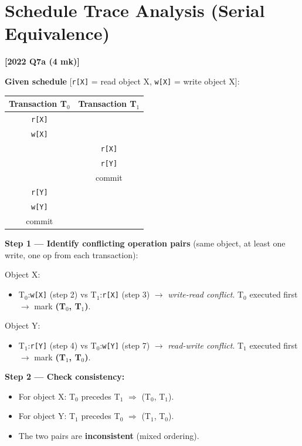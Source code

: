 \documentclass[11pt,a4paper]{article}
\newcommand{\qref}[1]{\textbf{\textcolor{examblue}{[#1]}}}
\newcommand{\mk}[1]{\textcolor{slidegray}{\small(#1 mk)}}
\begin{document}
\section{Schedule Trace Analysis (Serial Equivalence)}
\qref{2022 Q7a \mk{4}}

\begin{answerbox}
\textbf{Given schedule} [\texttt{r[X]} = read object X, \texttt{w[X]} = write object X]:

\begin{center}
\begin{tabular}{c|c}
\toprule
\textbf{Transaction T$_0$} & \textbf{Transaction T$_1$} \\
\midrule
\texttt{r[X]} & \\
\texttt{w[X]} & \\
 & \texttt{r[X]} \\
 & \texttt{r[Y]} \\
 & commit \\
\texttt{r[Y]} & \\
\texttt{w[Y]} & \\
commit & \\
\bottomrule
\end{tabular}
\end{center}

\textbf{Step 1 --- Identify conflicting operation pairs} (same object, at least one write, one op from each transaction):

Object X:
\begin{itemize}
  \item T$_0$:\texttt{w[X]} (step 2) vs T$_1$:\texttt{r[X]} (step 3) $\to$ \emph{write-read conflict}. T$_0$ executed first $\to$ mark \textbf{(T$_0$, T$_1$)}.
\end{itemize}

Object Y:
\begin{itemize}
  \item T$_1$:\texttt{r[Y]} (step 4) vs T$_0$:\texttt{w[Y]} (step 7) $\to$ \emph{read-write conflict}. T$_1$ executed first $\to$ mark \textbf{(T$_1$, T$_0$)}.
\end{itemize}

\textbf{Step 2 --- Check consistency:}
\begin{itemize}
  \item For object X: T$_0$ precedes T$_1$ $\Rightarrow$ (T$_0$, T$_1$).
  \item For object Y: T$_1$ precedes T$_0$ $\Rightarrow$ (T$_1$, T$_0$).
  \item The two pairs are \textbf{inconsistent} (mixed ordering).
\end{itemize}


\end{answerbox}
\end{document}
